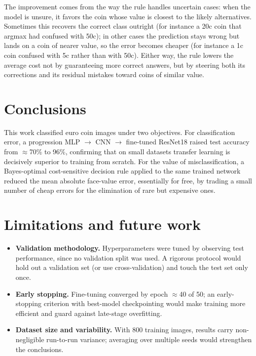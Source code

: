 \documentclass[11pt,a4paper]{article}
\begin{document}
The improvement comes from the way the rule handles uncertain cases: when the model is
unsure, it favors the coin whose value is closest to the likely alternatives. Sometimes
this recovers the correct class outright (for instance a 20c coin that argmax had
confused with 50c); in other cases the prediction stays wrong but lands on a coin of
nearer value, so the error becomes cheaper (for instance a 1c coin confused with 5c
rather than with 50c). Either way, the rule lowers the average cost not by guaranteeing
more correct answers, but by steering both its corrections and its residual mistakes
toward coins of similar value.
\section{Conclusions}

This work classified euro coin images under two objectives. For classification error, a
progression MLP $\to$ CNN $\to$ fine-tuned ResNet18 raised test accuracy from
$\approx$70\% to 96\%, confirming that on small datasets transfer learning is
decisively superior to training from scratch. For the value of misclassification, a
Bayes-optimal cost-sensitive decision rule applied to the same trained network reduced
the mean absolute face-value error, essentially for free, by trading a small number of
cheap errors for the elimination of rare but expensive ones.

\section{Limitations and future work}
\label{sec:limitations}

\begin{itemize}
  \item \textbf{Validation methodology.} Hyperparameters were tuned by observing test
  performance, since no validation split was used. A rigorous protocol would hold out a
  validation set (or use cross-validation) and touch the test set only once.
  \item \textbf{Early stopping.} Fine-tuning converged by epoch $\approx$40 of 50; an
  early-stopping criterion with best-model checkpointing would make training more
  efficient and guard against late-stage overfitting.
  \item \textbf{Dataset size and variability.} With 800 training images, results carry
  non-negligible run-to-run variance; averaging over multiple seeds would strengthen
  the conclusions.
\end{itemize}
\end{document}
